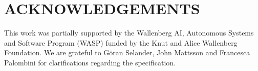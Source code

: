 \documentclass[runningheads]{llncs}
\begin{document}
\section*{ACKNOWLEDGEMENTS}
This work was partially supported by
the Wallenberg AI, Autonomous Systems and Software Program (WASP) 
funded by
the Knut and Alice Wallenberg Foundation.
%
We are grateful to G\"oran Selander, John Mattsson and Francesca Palombini 
for
clarifications regarding the specification.
%


{\small
    
}
\end{document}
